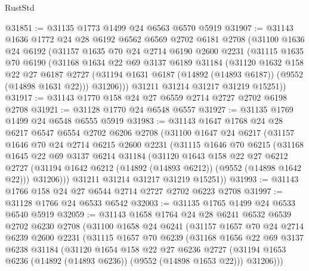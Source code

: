 \begin{lexlean}{RustStd}
\begin{coremodule}
@31851 := @31135 @1773 @1499 @24 @6563 @6570 @5919
@31907 := @31143
    @1636
    @1772
    @24
    @28
    @6192
    @6562
    @6569
    @2702
    @6181
    @2708
    (@31100
      @1636
      @24
      @6192
      (@31157
        @1635
        @70
        @24
        @2714
        @6190
        @2600
        @2231
        (@31115
          @1635
          @70
          @6190
          (@31168
            @1634
            @22
            @69
            @3137
            @6189
            @31184
            (@31120
              @1632
              @158
              @22
              @27
              @6187
              @2727
              (@31194 @1631 @6187 (@14892 (@14893 @6187)) (@9552 (@14898 @1631 @22)))
              @31206)))
        @31211
        @31214
        @31217
        @31219
        @15251))
@31917 := @31143 @1770 @158 @24 @27 @6559 @2714 @2727 @2702 @6198 @2708
@31921 := @31128 @1770 @24 @6548 @6557
@31927 := @31135 @1769 @1499 @24 @6548 @6555 @5919
@31983 := @31143
    @1647
    @1768
    @24
    @28
    @6217
    @6547
    @6554
    @2702
    @6206
    @2708
    (@31100
      @1647
      @24
      @6217
      (@31157
        @1646
        @70
        @24
        @2714
        @6215
        @2600
        @2231
        (@31115
          @1646
          @70
          @6215
          (@31168
            @1645
            @22
            @69
            @3137
            @6214
            @31184
            (@31120
              @1643
              @158
              @22
              @27
              @6212
              @2727
              (@31194 @1642 @6212 (@14892 (@14893 @6212)) (@9552 (@14898 @1642 @22)))
              @31206)))
        @31211
        @31214
        @31217
        @31219
        @15251))
@31993 := @31143 @1766 @158 @24 @27 @6544 @2714 @2727 @2702 @6223 @2708
@31997 := @31128 @1766 @24 @6533 @6542
@32003 := @31135 @1765 @1499 @24 @6533 @6540 @5919
@32059 := @31143
    @1658
    @1764
    @24
    @28
    @6241
    @6532
    @6539
    @2702
    @6230
    @2708
    (@31100
      @1658
      @24
      @6241
      (@31157
        @1657
        @70
        @24
        @2714
        @6239
        @2600
        @2231
        (@31115
          @1657
          @70
          @6239
          (@31168
            @1656
            @22
            @69
            @3137
            @6238
            @31184
            (@31120
              @1654
              @158
              @22
              @27
              @6236
              @2727
              (@31194 @1653 @6236 (@14892 (@14893 @6236)) (@9552 (@14898 @1653 @22)))
              @31206)))

\end{coremodule}
\end{lexlean}
